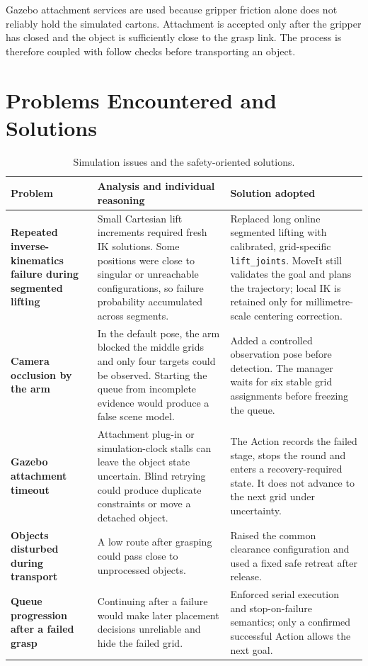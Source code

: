 \documentclass[11pt,a4paper]{article}
\begin{document}
Gazebo attachment services are used because gripper friction alone does not reliably hold the simulated cartons. Attachment is accepted only after the gripper has closed and the object is sufficiently close to the grasp link. The process is therefore coupled with follow checks before transporting an object.

\section{Problems Encountered and Solutions}

\begin{table}[H]
\centering
\small
\begin{tabularx}{\textwidth}{@{}>{\bfseries}p{33mm}X X@{}}
\toprule
Problem & Analysis and individual reasoning & Solution adopted \\
\midrule
Repeated inverse-kinematics failure during segmented lifting & Small Cartesian lift increments required fresh IK solutions. Some positions were close to singular or unreachable configurations, so failure probability accumulated across segments. & Replaced long online segmented lifting with calibrated, grid-specific \texttt{lift\_joints}. MoveIt still validates the goal and plans the trajectory; local IK is retained only for millimetre-scale centering correction. \\
Camera occlusion by the arm & In the default pose, the arm blocked the middle grids and only four targets could be observed. Starting the queue from incomplete evidence would produce a false scene model. & Added a controlled observation pose before detection. The manager waits for six stable grid assignments before freezing the queue. \\
Gazebo attachment timeout & Attachment plug-in or simulation-clock stalls can leave the object state uncertain. Blind retrying could produce duplicate constraints or move a detached object. & The Action records the failed stage, stops the round and enters a recovery-required state. It does not advance to the next grid under uncertainty. \\
Objects disturbed during transport & A low route after grasping could pass close to unprocessed objects. & Raised the common clearance configuration and used a fixed safe retreat after release. \\
Queue progression after a failed grasp & Continuing after a failure would make later placement decisions unreliable and hide the failed grid. & Enforced serial execution and stop-on-failure semantics; only a confirmed successful Action allows the next goal. \\
\bottomrule
\end{tabularx}
\caption{Simulation issues and the safety-oriented solutions.}
\label{tab:problems}
\end{table}
\end{document}
